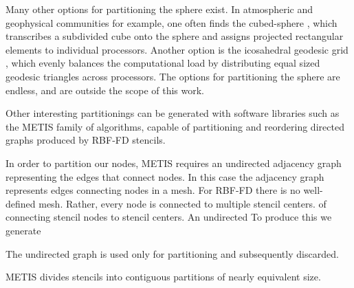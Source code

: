 \documentclass{report}
\begin{document}
Many other options for partitioning the sphere exist. In atmospheric and geophysical communities for example, one often finds the cubed-sphere \cite{Ivan2011, Katta2012}, which transcribes a subdivided cube onto the sphere and assigns projected rectangular elements to individual processors. Another option is the icosahedral geodesic grid \cite{Randall2002}, which evenly balances the computational load by distributing equal sized geodesic triangles across processors. The options for partitioning the sphere are endless, and are outside the scope of this work. 



Other interesting partitionings can be generated with software libraries such as the METIS \cite{Karypis1999} family of algorithms, capable of partitioning and reordering directed graphs produced by RBF-FD stencils. 





In order to partition our nodes, METIS requires an undirected adjacency graph representing the edges that connect nodes. In this case the adjacency graph represents edges connecting nodes in a mesh. For RBF-FD there is no well-defined mesh. Rather, every node is connected to multiple stencil centers.  of connecting stencil nodes to stencil centers. An undirected  To produce this we generate 

The undirected graph is used only for partitioning and subsequently discarded. 

METIS divides stencils into contiguous partitions of nearly equivalent size. 
\end{document}
